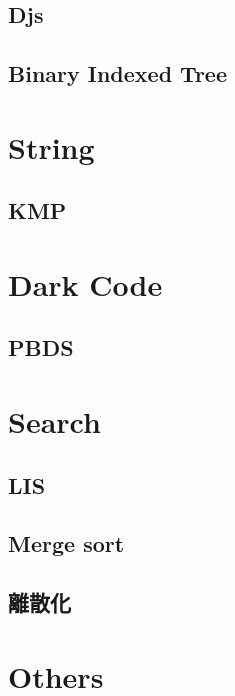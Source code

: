 \subsection{Djs}

\subsection{Binary Indexed Tree}



\section{String}

\subsection{KMP}



\section{Dark Code}

\subsection{PBDS}


\section{Search}

\subsection{LIS}

\subsection{Merge sort}

\subsection{離散化}




\section{Others}

